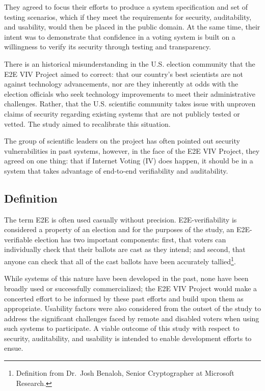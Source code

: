 They agreed to focus their efforts to produce a system specification
and set of testing scenarios, which if they meet the requirements for
security, auditability, and usability, would then be placed in the
public domain. At the same time, their intent was to demonstrate that
confidence in a voting system is built on a willingness to verify its
security through testing and transparency. 

There is an historical misunderstanding in the U.S. election community
that the E2E VIV Project aimed to correct: that our country’s best
scientists are not against technology advancements, nor are they
inherently at odds with the election officials who seek technology
improvements to meet their administrative challenges. Rather, that the
U.S. scientific community takes issue with unproven claims of security
regarding existing systems that are not publicly tested or vetted. The
study aimed to recalibrate this situation. 

The group of scientific leaders on the project has often pointed out
security vulnerabilities in past systems, however, in the face of the
E2E VIV Project, they agreed on one thing: that if Internet Voting
(IV) does happen, it should be in a system that takes advantage of
end-to-end verifiability and auditability.

\subsection{Definition}

The term E2E is often used casually without
precision. E2E-verifiability is considered a property of an election
and for the purposes of the study, an E2E-verifiable election has two
important components: first, that voters can individually check that
their ballots are cast as they intend; and second, that anyone can
check that all of the cast ballots have been accurately
tallied\footnote{Definition from Dr.~Josh Benaloh, Senior
  Cryptographer at Microsoft Research.}.

While systems of this nature have been developed in the past, none
have been broadly used or successfully commercialized; the E2E VIV
Project would make a concerted effort to be informed by these past
efforts and build upon them as appropriate. Usability factors were
also considered from the outset of the study to address the
significant challenges faced by remote and disabled voters when using
such systems to participate. A viable outcome of this study with
respect to security, auditability, and usability is intended to enable
development efforts to ensue.

